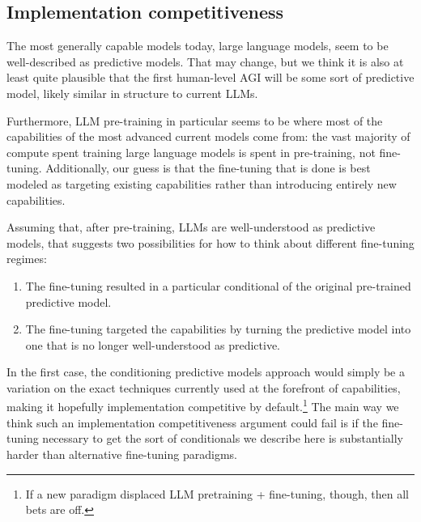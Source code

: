 \documentclass[
  onecolumn,
  nonatbib,
]{miri-tech-article}
\begin{document}
\subsection{Implementation competitiveness}

The most generally capable models today, large language models, seem to be well-described as predictive models. That may change, but we think it is also at least quite plausible that the first human-level AGI will be some sort of predictive model, likely similar in structure to current LLMs.

Furthermore, LLM pre-training in particular seems to be where most of the capabilities of the most advanced current models come from: the vast majority of compute spent training large language models is spent in pre-training, not fine-tuning. Additionally, our guess is that the fine-tuning that is done is best modeled as targeting existing capabilities rather than introducing entirely new capabilities.

Assuming that, after pre-training, LLMs are well-understood as predictive models, that suggests two possibilities for how to think about different fine-tuning regimes:



\begin{enumerate}
\item The fine-tuning resulted in a particular conditional of the original pre-trained predictive model.
\item The fine-tuning targeted the capabilities by turning the predictive model into one that is no longer well-understood as predictive.
\end{enumerate}

In the first case, the conditioning predictive models approach would simply be a variation on the exact techniques currently used at the forefront of capabilities, making it hopefully implementation competitive by default.\footnote{If a new paradigm displaced LLM pretraining + fine-tuning, though, then all bets are off.} The main way we think such an implementation competitiveness argument could fail is if the fine-tuning necessary to get the sort of conditionals we describe here is substantially harder than alternative fine-tuning paradigms.
\end{document}
